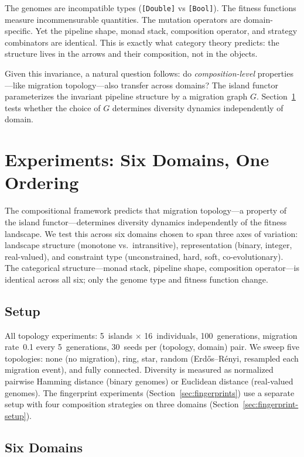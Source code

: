 \documentclass[dvipsnames,format=sigconf,anonymous=false,review=false]{acmart}
\begin{document}
The genomes are incompatible types (\texttt{[Double]} vs \texttt{[Bool]}). The fitness functions measure incommensurable quantities. The mutation operators are domain-specific. Yet the pipeline shape, monad stack, composition operator, and strategy combinators are identical. This is exactly what category theory predicts: the structure lives in the arrows and their composition, not in the objects.

Given this invariance, a natural question follows: do \emph{composition-level} properties---like migration topology---also transfer across domains? The island functor parameterizes the invariant pipeline structure by a migration graph $G$. Section~\ref{sec:experiments} tests whether the choice of $G$ determines diversity dynamics independently of domain.


\section{Experiments: Six Domains, One Ordering}
\label{sec:experiments}

The compositional framework predicts that migration topology---a property of the island functor---determines diversity dynamics independently of the fitness landscape. We test this across six domains chosen to span three axes of variation: landscape structure (monotone vs.\ intransitive), representation (binary, integer, real-valued), and constraint type (unconstrained, hard, soft, co-evolutionary). The categorical structure---monad stack, pipeline shape, composition operator---is identical across all six; only the genome type and fitness function change.

\subsection{Setup}

All topology experiments: 5~islands $\times$ 16~individuals, 100~generations, migration rate~0.1 every 5~generations, 30~seeds per (topology, domain) pair. We sweep five topologies: none (no migration), ring, star, random (Erd\H{o}s--R\'{e}nyi, resampled each migration event), and fully connected. Diversity is measured as normalized pairwise Hamming distance (binary genomes) or Euclidean distance (real-valued genomes). The fingerprint experiments (Section~\ref{sec:fingerprints}) use a separate setup with four composition strategies on three domains (Section~\ref{sec:fingerprint-setup}).

\subsection{Six Domains}
\end{document}
